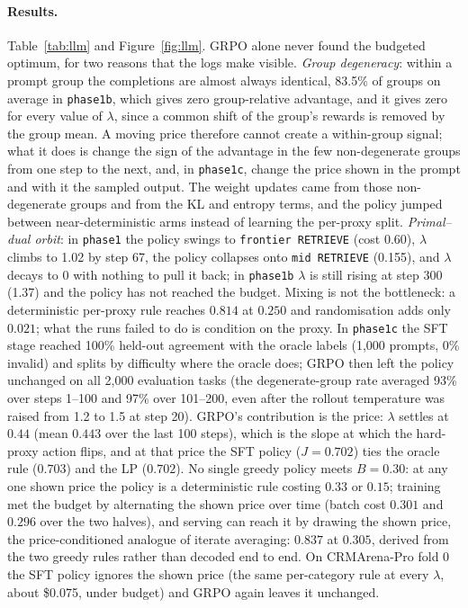 \documentclass[10pt]{article}
\newcommand{\code}[1]{\texttt{#1}}
\begin{document}
\paragraph{Results.} Table~\ref{tab:llm} and Figure~\ref{fig:llm}. GRPO alone never found the budgeted optimum, for two reasons that the logs make visible. \emph{Group degeneracy}: within a prompt group the completions are almost always identical, 83.5\% of groups on average in \code{phase1b}, which gives zero group-relative advantage, and it gives zero for every value of $\lambda$, since a common shift of the group's rewards is removed by the group mean. A moving price therefore cannot create a within-group signal; what it does is change the sign of the advantage in the few non-degenerate groups from one step to the next, and, in \code{phase1c}, change the price shown in the prompt and with it the sampled output. The weight updates came from those non-degenerate groups and from the KL and entropy terms, and the policy jumped between near-deterministic arms instead of learning the per-proxy split. \emph{Primal--dual orbit}: in \code{phase1} the policy swings to \code{frontier RETRIEVE} (cost 0.60), $\lambda$ climbs to 1.02 by step 67, the policy collapses onto \code{mid RETRIEVE} (0.155), and $\lambda$ decays to 0 with nothing to pull it back; in \code{phase1b} $\lambda$ is still rising at step 300 (1.37) and the policy has not reached the budget. Mixing is not the bottleneck: a deterministic per-proxy rule reaches $0.814$ at $0.250$ and randomisation adds only $0.021$; what the runs failed to do is condition on the proxy. In \code{phase1c} the SFT stage reached 100\% held-out agreement with the oracle labels (1{,}000 prompts, 0\% invalid) and splits by difficulty where the oracle does; GRPO then left the policy unchanged on all 2{,}000 evaluation tasks (the degenerate-group rate averaged 93\% over steps 1--100 and 97\% over 101--200, even after the rollout temperature was raised from 1.2 to 1.5 at step 20). GRPO's contribution is the price: $\lambda$ settles at $0.44$ (mean $0.443$ over the last 100 steps), which is the slope at which the hard-proxy action flips, and at that price the SFT policy ($J=0.702$) ties the oracle rule ($0.703$) and the LP ($0.702$). No single greedy policy meets $B=0.30$: at any one shown price the policy is a deterministic rule costing $0.33$ or $0.15$; training met the budget by alternating the shown price over time (batch cost $0.301$ and $0.296$ over the two halves), and serving can reach it by drawing the shown price, the price-conditioned analogue of iterate averaging: $0.837$ at $0.305$, derived from the two greedy rules rather than decoded end to end. On CRMArena-Pro fold 0 the SFT policy ignores the shown price (the same per-category rule at every $\lambda$, about \$0.075, under budget) and GRPO again leaves it unchanged.
\end{document}
